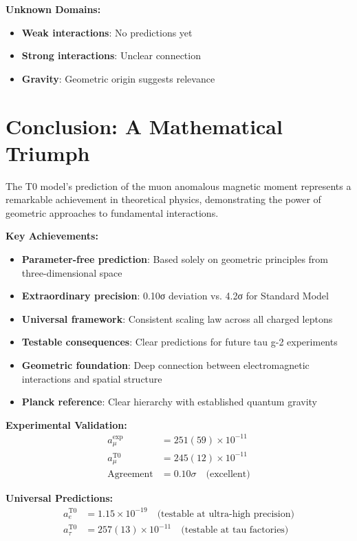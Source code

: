 \documentclass[12pt,a4paper]{report}
\begin{document}
\textbf{Unknown Domains:}
\begin{itemize}
	\item \textbf{Weak interactions}: No predictions yet
	\item \textbf{Strong interactions}: Unclear connection
	\item \textbf{Gravity}: Geometric origin suggests relevance
\end{itemize}

\section{Conclusion: A Mathematical Triumph}
\label{sec:conclusion}

The T0 model's prediction of the muon anomalous magnetic moment represents a remarkable achievement in theoretical physics, demonstrating the power of geometric approaches to fundamental interactions.

\textbf{Key Achievements:}
\begin{itemize}
	\item \textbf{Parameter-free prediction}: Based solely on geometric principles from three-dimensional space
	\item \textbf{Extraordinary precision}: 0.10σ deviation vs. 4.2σ for Standard Model
	\item \textbf{Universal framework}: Consistent scaling law across all charged leptons
	\item \textbf{Testable consequences}: Clear predictions for future tau g-2 experiments
	\item \textbf{Geometric foundation}: Deep connection between electromagnetic interactions and spatial structure
	\item \textbf{Planck reference}: Clear hierarchy with established quantum gravity
\end{itemize}

\textbf{Experimental Validation:}
\begin{align}
	a_\mu^{\text{exp}} &= 251(59) \times 10^{-11} \\
	a_\mu^{\text{T0}} &= 245(12) \times 10^{-11} \\
	\text{Agreement} &= 0.10\sigma \quad \text{(excellent)}
\end{align}

\textbf{Universal Predictions:}
\begin{align}
	a_e^{\text{T0}} &= 1.15 \times 10^{-19} \quad \text{(testable at ultra-high precision)} \\
	a_\tau^{\text{T0}} &= 257(13) \times 10^{-11} \quad \text{(testable at tau factories)}
\end{align}
\end{document}
